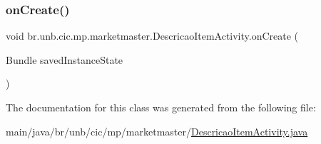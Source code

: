 \subsubsection{\texorpdfstring{on\+Create()}{onCreate()}}
{\footnotesize\ttfamily void br.\+unb.\+cic.\+mp.\+marketmaster.\+Descricao\+Item\+Activity.\+on\+Create (\begin{DoxyParamCaption}\item[{Bundle}]{saved\+Instance\+State }\end{DoxyParamCaption})\hspace{0.3cm}{\ttfamily [protected]}}



The documentation for this class was generated from the following file\+:\begin{DoxyCompactItemize}
\item 
main/java/br/unb/cic/mp/marketmaster/\mbox{\hyperlink{DescricaoItemActivity_8java}{Descricao\+Item\+Activity.\+java}}\end{DoxyCompactItemize}
